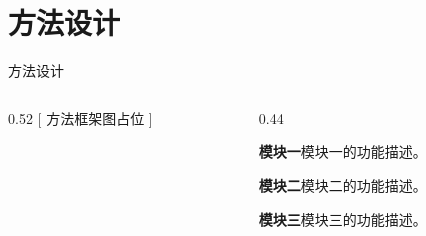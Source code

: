 \section{方法设计}

\begin{frame}{方法设计}

  \begin{columns}[T,onlytextwidth]
    \begin{column}{0.52\textwidth}
      \centering
      \vspace{3cm}
      \textcolor{ZJUGray}{\large [ 方法框架图占位 ]}
    \end{column}%
    \begin{column}{0.44\textwidth}
      \begin{compactitem}
        \item \textbf{模块一}模块一的功能描述。
        \item \textbf{模块二}模块二的功能描述。
        \item \textbf{模块三}模块三的功能描述。
      \end{compactitem}
    \end{column}
  \end{columns}
\end{frame}
